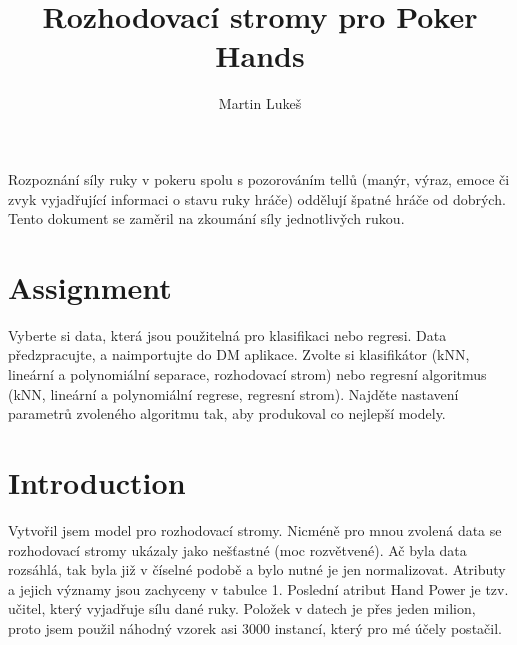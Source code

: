 \documentclass[journal]{IEEEtran}
\begin{document}
%
\title{Rozhodovac\'{i} stromy pro Poker Hands}
\author{Martin Luke\v{s}
}

\maketitle


\begin{abstrakt}
Rozpozn\'an\'i s\'ily ruky v pokeru spolu s pozorov\'an\'im tell\r{u} (man\'yr, v\'yraz, emoce \v{c}i zvyk vyjad\v{r}uj\'{i}c\'{i} informaci o stavu ruky hr\'{a}\v{c}e) odd\v{e}luj\'i \v{s}patn\'{e} hr\'a\v{c}e od dobr\'ych. Tento dokument se zam\v{e}ril na zkoum\'{a}n\'{i} s\'{i}ly jednotliv\v{y}ch rukou.
\end{abstrakt}

\section{Assignment}
Vyberte si data, kter\'{a} jsou pou\v{z}iteln\'{a} pro klasifikaci nebo
regresi. Data p\v{r}edzpracujte, a naimportujte do DM aplikace.
Zvolte si klasifik\'{a}tor (kNN, line\'{a}rn\'{i} a polynomi\'{a}ln\'{i} separace,
rozhodovac\'{i} strom) nebo regresn\'{i} algoritmus (kNN, line\'{a}rn\'{i}
a polynomi\'{a}ln\'{i} regrese, regresn\'{i} strom). Najd\v{e}te nastaven\'{i}
parametr\r{u} zvolen\'{e}ho algoritmu tak, aby produkoval co nejlep\v{s}\'{i}
modely.
\section{Introduction}
Vytvo\v{r}il jsem model pro rozhodovac\'{i} stromy. Nicm\'{e}n\v{e} pro mnou zvolen\'{a} data se rozhodovac\'{i} stromy uk\'{a}zaly jako ne\v{s}\v{t}astn\'{e} (moc rozv\v{e}tven\'{e}). A\v{c} byla data rozs\'{a}hl\'{a}, tak byla ji\v{z} v \v{c}\'{i}seln\'{e} podob\v{e} a bylo nutn\'{e} je jen normalizovat.
Atributy a jejich v\'{y}znamy jsou zachyceny v tabulce 1. Posledn\'{i} atribut Hand Power je tzv. u\v{c}itel, kter\'{y} vyjad\v{r}uje s\'{i}lu dan\'{e} ruky. Polo\v{z}ek v datech je p\v{r}es jeden milion, proto jsem pou\v{z}il n\'{a}hodn\'{y} vzorek asi 3000 instanc\'{i}, kter\'{y} pro m\'{e} \'{u}\v{c}ely posta\v{c}il.
%
\end{document}
